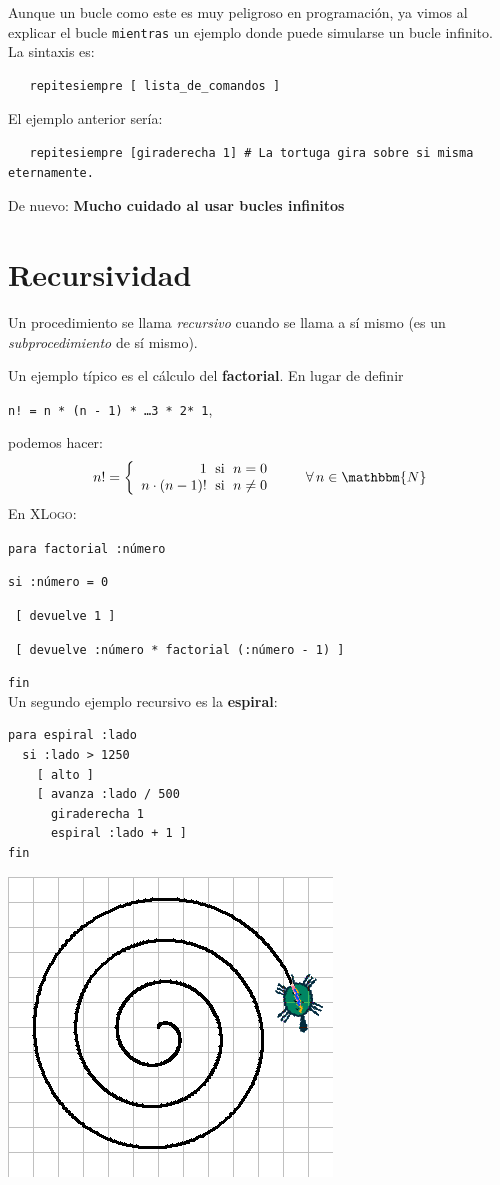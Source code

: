 Aunque un bucle como este es muy peligroso en programaci\'on, ya vimos al explicar
el bucle \texttt{mientras} un ejemplo donde puede simularse un bucle infinito. La
sintaxis es:
\begin{verbatim}
   repitesiempre [ lista_de_comandos ] \end{verbatim}
El ejemplo anterior ser\'ia:
\begin{verbatim}
   repitesiempre [giraderecha 1] # La tortuga gira sobre si misma eternamente. 
\end{verbatim}

De nuevo: \textbf{Mucho cuidado al usar bucles infinitos}

\section{Recursividad}
   \label{Recursividad}

Un procedimiento se llama \textit{recursivo} cuando se llama a s\'i mismo
(es un \textit{subprocedimiento} de s\'i mismo). 

Un ejemplo t\'ipico es el c\'alculo del \textbf{factorial}. En lugar de definir

\texttt{n! = n * (n - 1) * \ldots * 3 * 2* 1},

podemos hacer:
 \[ n! = \left\{ \begin{array}{r@{\;\textrm{ si }\;}l}
                  1 & n = 0 \\ n \cdot (n - 1)! & n \neq 0
                \end{array} \right. \qquad \forall \, n \in \mathbbm{N} \]
En \textsc{XLogo}:

\noindent \texttt{para factorial :n\'umero}

\texttt{si :n\'umero = 0}

 \texttt{ [ devuelve 1 ]}

 \texttt{ [ devuelve :n\'umero * factorial (:n\'umero - 1) ]}

\noindent \texttt{fin} \\

\noindent Un segundo ejemplo recursivo es la \textbf{espiral}:

\begin{verbatim}
para espiral :lado
  si :lado > 1250
    [ alto ]
    [ avanza :lado / 500
      giraderecha 1
      espiral :lado + 1 ]
fin \end{verbatim}
\begin{center}
   \includegraphics[scale=0.6]{Imagenes/07_Bucles/Espiral.png}
\end{center}
